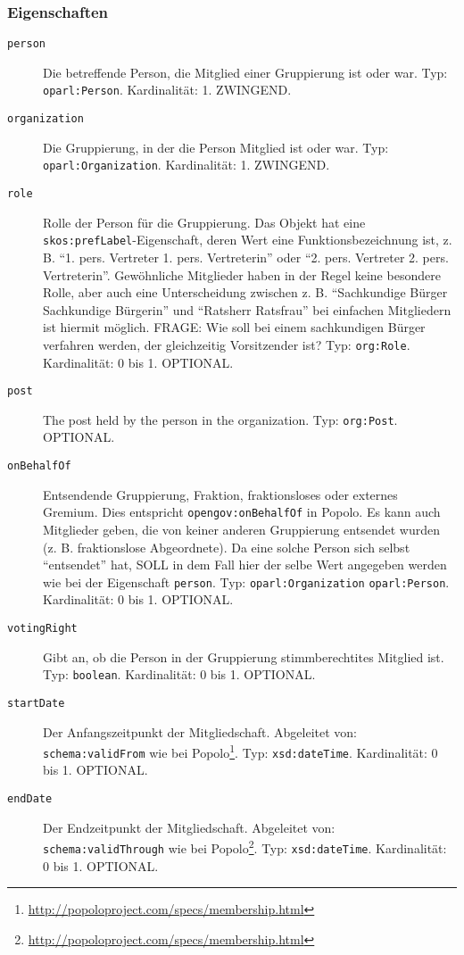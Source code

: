 \documentclass[,a4paper]{article}
\begin{document}
\subsubsection{Eigenschaften}\label{eigenschaften-10}

\begin{description}
\item[\texttt{person}]
Die betreffende Person, die Mitglied einer Gruppierung ist oder war.
Typ: \texttt{oparl:Person}. Kardinalität: 1. ZWINGEND.
\item[\texttt{organization}]
Die Gruppierung, in der die Person Mitglied ist oder war. Typ:
\texttt{oparl:Organization}. Kardinalität: 1. ZWINGEND.
\item[\texttt{role}]
Rolle der Person für die Gruppierung. Das Objekt hat eine
\texttt{skos:prefLabel}-Eigenschaft, deren Wert eine
Funktionsbezeichnung ist, z. B. ``1. pers. Vertreter \textbar{} 1. pers.
Vertreterin'' oder ``2. pers. Vertreter \textbar{} 2. pers.
Vertreterin''. Gewöhnliche Mitglieder haben in der Regel keine besondere
Rolle, aber auch eine Unterscheidung zwischen z. B. ``Sachkundige Bürger
\textbar{} Sachkundige Bürgerin'' und ``Ratsherr \textbar{} Ratsfrau''
bei einfachen Mitgliedern ist hiermit möglich. FRAGE: Wie soll bei einem
sachkundigen Bürger verfahren werden, der gleichzeitig Vorsitzender ist?
Typ: \texttt{org:Role}. Kardinalität: 0 bis 1. OPTIONAL.
\item[\texttt{post}]
The post held by the person in the organization. Typ: \texttt{org:Post}.
OPTIONAL.
\item[\texttt{onBehalfOf}]
Entsendende Gruppierung, Fraktion, fraktionsloses oder externes Gremium.
Dies entspricht \texttt{opengov:onBehalfOf} in Popolo. Es kann auch
Mitglieder geben, die von keiner anderen Gruppierung entsendet wurden
(z. B. fraktionslose Abgeordnete). Da eine solche Person sich selbst
``entsendet'' hat, SOLL in dem Fall hier der selbe Wert angegeben werden
wie bei der Eigenschaft \texttt{person}. Typ:
\texttt{oparl:Organization} \textbar{} \texttt{oparl:Person}.
Kardinalität: 0 bis 1. OPTIONAL.
\item[\texttt{votingRight}]
Gibt an, ob die Person in der Gruppierung stimmberechtites Mitglied ist.
Typ: \texttt{boolean}. Kardinalität: 0 bis 1. OPTIONAL.
\item[\texttt{startDate}]
Der Anfangszeitpunkt der Mitgliedschaft. Abgeleitet von:
\texttt{schema:validFrom} wie bei Popolo\footnote{\url{http://popoloproject.com/specs/membership.html}}.
Typ: \texttt{xsd:dateTime}. Kardinalität: 0 bis 1. OPTIONAL.
\item[\texttt{endDate}]
Der Endzeitpunkt der Mitgliedschaft. Abgeleitet von:
\texttt{schema:validThrough} wie bei Popolo\footnote{\url{http://popoloproject.com/specs/membership.html}}.
Typ: \texttt{xsd:dateTime}. Kardinalität: 0 bis 1. OPTIONAL.
\end{description}
\end{document}
